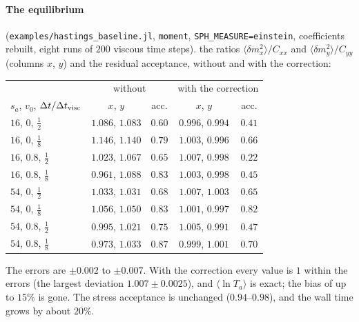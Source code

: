 \documentclass[11pt,aps,preprint,nofootinbib,superscriptaddress,tightenlines]{revtex4-2}
\let\oldparagraph\paragraph
\renewcommand{\paragraph}{\par\bigskip\oldparagraph}
\begin{document}
\paragraph{The equilibrium} (\texttt{examples/hastings\_baseline.jl}, \texttt{moment}, \texttt{SPH\_MEASURE=einstein}, coefficients rebuilt, eight runs of $200$
viscous time steps).  the ratios $\langle\delta m_x^2\rangle/C_{xx}$ and $\langle\delta m_y^2\rangle/C_{yy}$ (columns $x$, $y$) and the residual acceptance, without and
with the correction:
\begin{center}
\begin{tabular}{lcccc}
\hline
 & \multicolumn{2}{c}{without} & \multicolumn{2}{c}{with the correction} \\
$s_a$, $v_0$, $\Delta t/\Delta t_{\rm visc}$ & $x$, $y$ & acc. & $x$, $y$ & acc. \\ \hline
$16$, $0$, $\frac12$   & $1.086$, $1.083$ & $0.60$ & $0.996$, $0.994$ & $0.41$ \\
$16$, $0$, $\frac18$   & $1.146$, $1.140$ & $0.79$ & $1.003$, $0.996$ & $0.66$ \\
$16$, $0.8$, $\frac12$ & $1.023$, $1.067$ & $0.65$ & $1.007$, $0.998$ & $0.22$ \\
$16$, $0.8$, $\frac18$ & $0.961$, $1.088$ & $0.83$ & $1.003$, $0.998$ & $0.45$ \\
$54$, $0$, $\frac12$   & $1.033$, $1.031$ & $0.68$ & $1.007$, $1.003$ & $0.65$ \\
$54$, $0$, $\frac18$   & $1.056$, $1.050$ & $0.83$ & $1.001$, $0.997$ & $0.82$ \\
$54$, $0.8$, $\frac12$ & $0.995$, $1.021$ & $0.75$ & $1.005$, $0.991$ & $0.47$ \\
$54$, $0.8$, $\frac18$ & $0.973$, $1.033$ & $0.87$ & $0.999$, $1.001$ & $0.70$ \\
\hline
\end{tabular}
\end{center}
The errors are $\pm0.002$ to $\pm0.007$.  With the correction every value is $1$ within the errors (the largest deviation $1.007\pm0.0025$), and
$\langle\ln T_a\rangle$ is exact; the bias of up to $15\%$ is gone.  The stress acceptance is unchanged ($0.94$--$0.98$), and the wall time grows by
about $20\%$.
\end{document}
